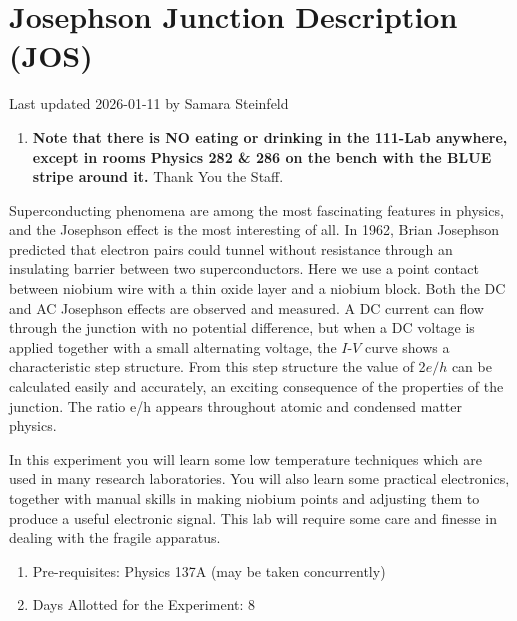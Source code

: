 \documentclass{../lab}
\begin{document}
\maketitle

\tableofcontents

\section{Josephson Junction Description (JOS)}

Last updated 2026-01-11 by Samara Steinfeld

\begin{enumerate}
    \item \textbf{Note that there is NO eating or drinking in the 111-Lab anywhere, except in rooms Physics 282 \& 286 on the bench with the BLUE stripe around it.} Thank You the Staff.
\end{enumerate}

Superconducting phenomena are among the most fascinating features in physics, and the Josephson effect is the most interesting of all. In 1962, Brian Josephson predicted that electron pairs could tunnel without resistance through an insulating barrier between two superconductors. Here we use a point contact between niobium wire with a thin oxide layer and a niobium block. Both the DC and AC Josephson effects are observed and measured. A DC current can flow through the junction with no potential difference, but when a DC voltage is applied together with a small alternating voltage, the $I$-$V$ curve shows a characteristic step structure. From this step structure the value of 2$e/h$ can be calculated easily and accurately, an exciting consequence of the properties of the junction. The ratio e/h appears throughout atomic and condensed matter physics.

In this experiment you will learn some low temperature techniques which are used in many research laboratories. You will also learn some practical electronics, together with manual skills in making niobium points and adjusting them to produce a useful electronic signal. This lab will require some care and finesse in dealing with the fragile apparatus.

\begin{enumerate}
    \item Pre-requisites: Physics 137A (may be taken concurrently)

    \item Days Allotted for the Experiment: 8
\end{enumerate}
\end{document}
